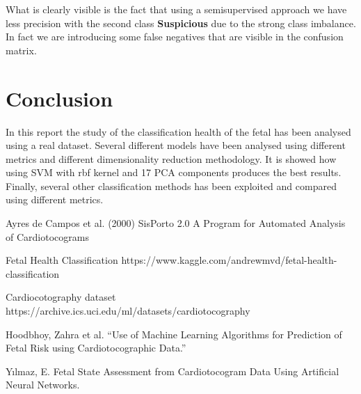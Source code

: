 \documentclass[a4paper,12pt]{article}
\begin{document}
\noindent What is clearly visible is the fact that using a semisupervised approach we have less precision with the second class \textbf{Suspicious} due to the strong class imbalance. In fact we are introducing some false negatives that are visible in the confusion matrix.

\section{Conclusion}

In this report the study of the classification health of the fetal has been analysed using a real dataset. Several different models have been analysed using different metrics and different dimensionality reduction methodology. It is showed how using SVM with rbf kernel and 17 PCA components produces the best results. Finally, several other classification methods has been exploited and compared using different metrics. 

\newpage
\begin{thebibliography}{9}
Ayres de Campos et al. (2000) SisPorto 2.0 A Program for Automated Analysis of Cardiotocograms

Fetal Health Classification https://www.kaggle.com/andrewmvd/fetal-health-classification

Cardiocotography dataset https://archive.ics.uci.edu/ml/datasets/cardiotocography

Hoodbhoy, Zahra et al. “Use of Machine Learning Algorithms for Prediction of Fetal Risk using Cardiotocographic Data.”

Yılmaz, E. Fetal State Assessment from Cardiotocogram Data Using Artificial Neural Networks.

\end{thebibliography}
\end{document}

